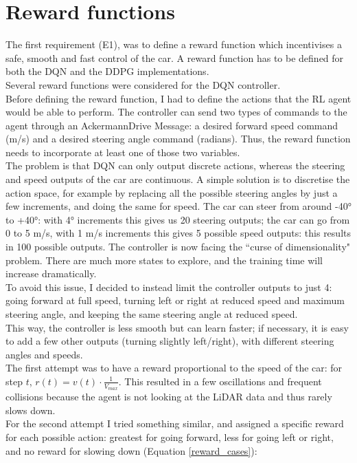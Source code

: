 \section{Reward functions}
The first requirement (E1), was to define a reward function which incentivises a safe, smooth and fast control of the car. A reward function has to be defined for both the DQN and the DDPG implementations. \\
Several reward functions were considered for the DQN controller. \\
Before defining the reward function, I had to define the actions that the RL agent would be able to perform. The controller can send two types of commands to the agent through an AckermannDrive Message: a desired forward speed command (m/s) and a desired steering angle command (radians). Thus, the reward function needs to incorporate at least one of those two variables. \\
The problem is that DQN can only output discrete actions, whereas the steering and speed outputs of the car are continuous. A simple solution is to discretise the action space, for example by replacing all the possible steering angles by just a few increments, and doing the same for speed. The car can steer from around -40° to +40°: with 4° increments this gives us 20 steering outputs; the car can go from 0 to 5 m/s, with 1 m/s increments this gives 5 possible speed outputs: this results in 100 possible outputs. The controller is now facing the ``curse of dimensionality" problem. There are much more states to explore, and the training time will increase dramatically. \\
To avoid this issue, I decided to instead limit the controller outputs to just 4: going forward at full speed, turning left or right at reduced speed and maximum steering angle, and keeping the same steering angle at reduced speed. \\
This way, the controller is less smooth but can learn faster; if necessary, it is easy to add a few other outputs (turning slightly left/right), with different steering angles and speeds. \\
The first attempt was to have a reward proportional to the speed of the car: for step $t$, $r(t) = v(t) \cdot \frac{1}{V_{max}}$. This resulted in a few oscillations and frequent collisions because the agent is not looking at the LiDAR data and thus rarely slows down. \\
For the second attempt I tried something similar, and assigned a specific reward for each possible action: greatest for going forward, less for going left or right, and no reward for slowing down (Equation \ref{reward_cases}):\\
